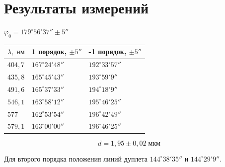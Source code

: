\section{Результаты измерений}
$\varphi_{0} = 179^{\circ} 56' 37'' \pm 5''$

\begin{tabular}{|l|l|l|}
\hline
    $\lambda,\;\text{нм}$ & 1 порядок, $\pm 5 ''$& -1 порядок, $\pm 5 ''$ \\\hline
    $404{,}7$ & $167^{\circ} 24' 48 ''$ & $192^{\circ} 33' 57 ''$ \\\hline
    $435{,}8$ & $165^{\circ} 45' 43 ''$ & $193^{\circ} 59' 9''$ \\\hline
    $491{,}6$ & $165^{\circ} 37' 33''$ & $194^{\circ} 18' 9''$ \\\hline
    $546{,}1$ & $163^{\circ} 58' 12''$ & $195^{\circ} 46' 25''$ \\\hline
    $577$ & $162^{\circ} 53' 54''$ & $196^{\circ} 42' 49''$ \\\hline
    $579{,}1$ & $163^{\circ} 00' 00''$ & $196^{\circ} 46' 25''$ \\\hline
\end{tabular}


\begin{figure}[ht!]
\end{figure}

\[
    d = 1{,}95 \pm 0{,}02\;\text{мкм}
\]

Для второго порядка положения линий дуплета $144^{\circ} 38' 35''$ и $144^{\circ} 29' 9''$.

